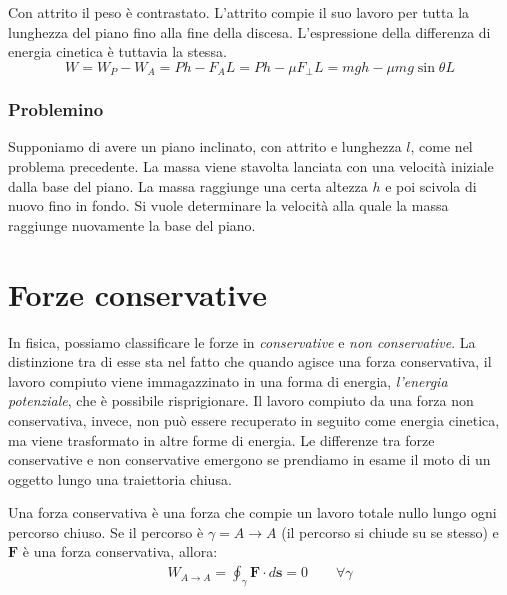 Con attrito il peso è contrastato. L'attrito compie il suo lavoro per tutta la
lunghezza del piano fino alla fine della discesa. L'espressione della differenza
di energia cinetica è tuttavia la stessa.
\[ W = W_P - W_A = Ph - F_AL = Ph - \mu F_\perp L = mgh - \mu mg\sin\theta L \]


\subsubsection*{Problemino}
Supponiamo di avere un piano inclinato, con attrito e lunghezza $l$, come nel problema precedente.
La massa viene stavolta lanciata con una velocità iniziale dalla base del piano.
La massa raggiunge una certa altezza $h$ e poi scivola di nuovo fino in fondo. Si
vuole determinare la velocità alla quale la massa raggiunge nuovamente la base del
piano.

\section{Forze conservative}
In fisica, possiamo classificare le forze in \textit{conservative} e \textit{non
conservative}. La distinzione tra di esse sta nel fatto che quando agisce una
forza conservativa, il lavoro compiuto viene immagazzinato in una forma di energia,
\textit{l'energia potenziale}, che è possibile risprigionare. Il lavoro compiuto
da una forza non conservativa, invece, non può essere recuperato in seguito come
energia cinetica, ma viene trasformato in altre forme di energia. Le differenze tra
forze conservative e non conservative emergono se prendiamo in esame il moto di un
oggetto lungo una traiettoria chiusa.

\vspace{8pt}
\begin{tcolorbox}[colback = red!30, colframe = red!30!black, title = {Forza conservativa (condizione I)}]
    Una forza conservativa è una forza che compie un lavoro totale nullo lungo ogni
    percorso chiuso. Se il percorso è $\gamma = A\to A$ (il percorso si chiude su
    se stesso) e $\mathbf{F}$ è una forza conservativa, allora:
    \begin{align}
        W_{A \to A} = \oint_\gamma \mathbf{F} \cdot d\mathbf{s} = 0 \qquad \forall \gamma
    \end{align}
\end{tcolorbox}
\vspace{5pt}

